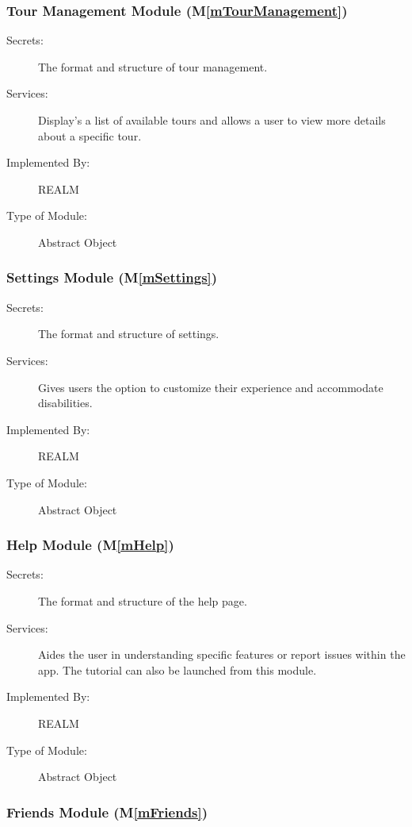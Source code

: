 \documentclass[12pt, titlepage]{article}
\newcommand{\mref}[1]{M\ref{#1}}
\begin{document}
\subsubsection{Tour Management Module (\mref{mTourManagement})}

\begin{description}
\item[Secrets:]The format and structure of tour management.
\item[Services:]Display's a list of available tours and allows a user to view more details about a specific tour.
\item[Implemented By:]REALM
\item[Type of Module:]Abstract Object
\end{description}

\subsubsection{Settings Module (\mref{mSettings})}

\begin{description}
\item[Secrets:]The format and structure of settings.
\item[Services:]Gives users the option to customize their experience and accommodate disabilities.
\item[Implemented By:]REALM
\item[Type of Module:]Abstract Object
\end{description}

\subsubsection{Help Module (\mref{mHelp})}

\begin{description}
\item[Secrets:]The format and structure of the help page.
\item[Services:]Aides the user in understanding specific features or report issues within the app. The tutorial can also be launched from this module.
\item[Implemented By:]REALM
\item[Type of Module:]Abstract Object
\end{description}

\subsubsection{Friends Module (\mref{mFriends})}
\end{document}

